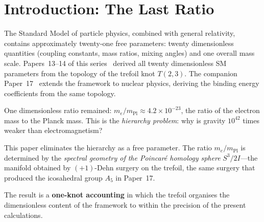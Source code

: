 \documentclass[11pt]{article}
\begin{document}
\begin{abstract}
Within the present accounting, no integer in the formula is
introduced as an independent input beyond those already
generated by the trefoil's surgery and spectrum; the cinquefoil
$T(2, 5)$ and heptafoil $T(2, 7)$ appear as derived labels rather
than additional free knots.  The theory still contains a
distinguished mass scale $v_\text{EW}$ (equivalently $m_e$),
which we treat as a reference scale setting the unit of
measurement; the zero-parameter claim refers to the
\emph{dimensionless} content.

Reproducibility: all analysis code (Laplacian eigenvalues on
$S^3/2I$, the $\mathrm{Cl}(0, 7)$ construction of $2T \subset
\mathrm{Spin}(7)$, the one-loop BPS pipeline, the $SU(N)$
robustness scan, and the $G$-formula verification) is available
at \url{https://github.com/JimGalasyn/null-worldtube}.
\end{abstract}

\tableofcontents

\section{Introduction: The Last Ratio}
\label{sec:intro}

The Standard Model of particle physics, combined with general
relativity, contains approximately twenty-one free parameters:
twenty dimensionless quantities (coupling constants, mass ratios,
mixing angles) and one overall mass scale.  Papers~13--14 of
this series~\cite{paper13,paper14} derived all twenty
dimensionless SM parameters from the topology of the trefoil
knot $T(2,3)$.  The companion Paper~17~\cite{paper17} extends
the framework to nuclear physics, deriving the binding energy
coefficients from the same topology.

One dimensionless ratio remained: $m_e/m_\text{Pl} \approx
4.2 \times 10^{-23}$, the ratio of the electron mass to the
Planck mass.  This is the \emph{hierarchy problem}: why is
gravity $10^{42}$ times weaker than electromagnetism?

This paper eliminates the hierarchy as a free parameter.  The
ratio $m_e/m_\text{Pl}$ is determined by the \emph{spectral
geometry of the Poincar\'e homology sphere} $S^3/2I$---the
manifold obtained by $(+1)$-Dehn surgery on the trefoil, the
same surgery that produced the icosahedral group $A_5$ in
Paper~17.

The result is a \textbf{one-knot accounting} in which the
trefoil organises the dimensionless content of the framework
to within the precision of the present calculations.
\end{document}
